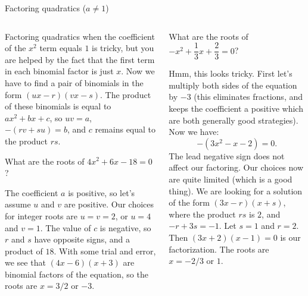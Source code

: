 \documentclass[9pt,aspectratio=169]{beamer}
\begin{document}
\begin{frame}{Factoring quadratics (\MakeLowercase{$a \neq 1$})}
  \begin{columns}[T]
    \begin{column}{0.5\textwidth}
      Factoring quadratics when the coefficient of the $x^2$ term equals $1$ is tricky, but you are helped by the fact that the first term in each binomial factor is just $x$.  Now we have to find a pair of binomials in the form $(ux - r)(vx - s)$.  The product of these binomials is equal to $ax^2 + bx + c$, so $uv = a$, $-(rv + su) = b$, and $c$ remains equal to the product $rs$.
      \begin{problem}
        What are the roots of $4x^2 + 6x - 18 = 0$?
      \end{problem}
      The coefficient $a$ is positive, so let's assume $u$ and $v$ are positive.  Our choices for integer roots are $u = v = 2$, or $u = 4$ and $v = 1$.  The value of $c$ is negative, so $r$ and $s$ have opposite signs, and a product of $18$.  With some trial and error, we see that $(4x - 6)(x + 3)$ are binomial factors of the equation, so the roots are $x = 3/2$ or $-3$.
    \end{column}
    \begin{column}{0.5\textwidth}
      \begin{problem}
        What are the roots of $-x^2 + \dfrac{1}{3} x + \dfrac{2}{3} = 0$?
      \end{problem}

      Hmm, this looks tricky.  First let's multiply both sides of the equation by $-3$ (this eliminates fractions, and keeps the coefficient a positive which are both generally good strategies).  Now we have:
	    \[ -(3x^2 - x - 2) = 0.\]
      The lead negative sign does not affect our factoring.  Our choices now are quite limited (which is a good thing).  We are looking for a solution of the form $(3x - r)(x + s)$, where the product $rs$ is $2$, and $-r + 3s = -1$.  Let $s = 1$ and $r = 2$.  Then $(3x + 2)(x - 1) = 0$ is our factorization.  The roots are $x = -2/3$ or $1$.
    \end{column}
  \end{columns}
\end{frame}
\end{document}
